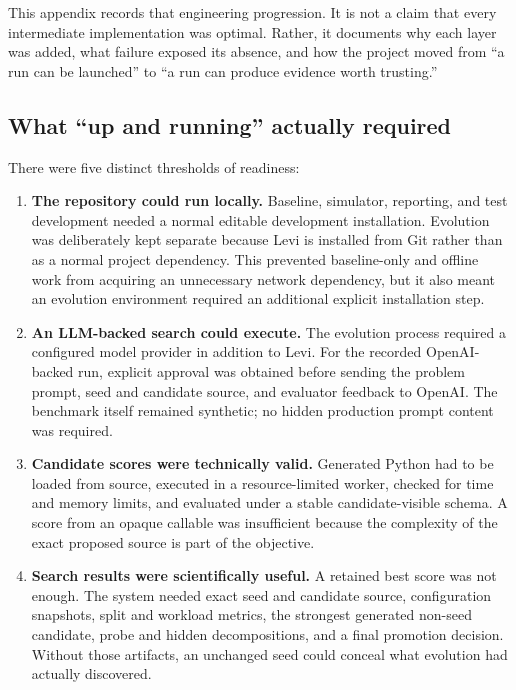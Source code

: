 \documentclass[11pt]{article}
\begin{document}
This appendix records that engineering progression.  It is not a claim that every
intermediate implementation was optimal.  Rather, it documents why each layer was
added, what failure exposed its absence, and how the project moved from ``a run can be
launched'' to ``a run can produce evidence worth trusting.''

\subsection{What ``up and running'' actually required}

There were five distinct thresholds of readiness:

\begin{enumerate}
  \item \textbf{The repository could run locally.}  Baseline, simulator, reporting, and
  test development needed a normal editable development installation.  Evolution was
  deliberately kept separate because Levi is installed from Git rather than as a
  normal project dependency.  This prevented baseline-only and offline work from
  acquiring an unnecessary network dependency, but it also meant an evolution
  environment required an additional explicit installation step.

  \item \textbf{An LLM-backed search could execute.}  The evolution process required a
  configured model provider in addition to Levi.  For the recorded OpenAI-backed run,
  explicit approval was obtained before sending the problem prompt, seed and candidate
  source, and evaluator feedback to OpenAI.  The benchmark itself remained synthetic;
  no hidden production prompt content was required.

  \item \textbf{Candidate scores were technically valid.}  Generated Python had to be
  loaded from source, executed in a resource-limited worker, checked for time and memory
  limits, and evaluated under a stable candidate-visible schema.  A score from an
  opaque callable was insufficient because the complexity of the exact proposed source
  is part of the objective.

  \item \textbf{Search results were scientifically useful.}  A retained best score was
  not enough.  The system needed exact seed and candidate source, configuration
  snapshots, split and workload metrics, the strongest generated non-seed candidate,
  probe and hidden decompositions, and a final promotion decision.  Without those
  artifacts, an unchanged seed could conceal what evolution had actually discovered.


\end{enumerate}
\end{document}

